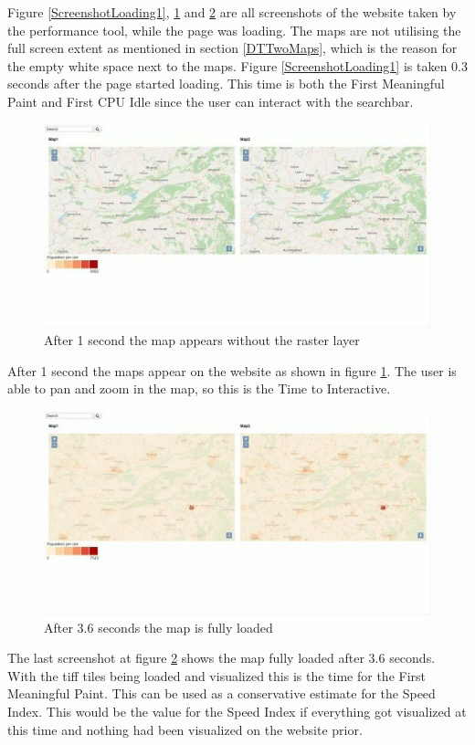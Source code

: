 Figure \ref{ScreenshotLoading1}, \ref{ScreenshotLoading2} and \ref{ScreenshotLoading3} are all screenshots of the website taken by the performance tool, while the page was loading. The maps are not utilising the full screen extent as mentioned in section \ref{DTTwoMaps}, which is the reason for the empty white space next to the maps. Figure \ref{ScreenshotLoading1} is taken 0.3 seconds after the page started loading. This time is both the First Meaningful Paint and First CPU Idle since the user can interact with the searchbar.

\begin{figure} [H]
	\centering
	\includegraphics[width=.8\textwidth]{Pictures/ScreenshotLoading2}
	\caption{After 1 second the map appears without the raster layer}
	\label{ScreenshotLoading2}
\end{figure}

After 1 second the maps appear on the website as shown in figure \ref{ScreenshotLoading2}. The user is able to pan and zoom in the map, so this is the Time to Interactive. 

\begin{figure} [H]
	\centering
	\includegraphics[width=.8\textwidth]{Pictures/ScreenshotLoading3}
	\caption{After 3.6 seconds the map is fully loaded}
	\label{ScreenshotLoading3}
\end{figure}

The last screenshot at figure \ref{ScreenshotLoading3} shows the map fully loaded after 3.6 seconds. With the tiff tiles being loaded and visualized this is the time for the First Meaningful Paint. This can be used as a conservative estimate for the Speed Index. This would be the value for the Speed Index if everything got visualized at this time and nothing had been visualized on the website prior.

